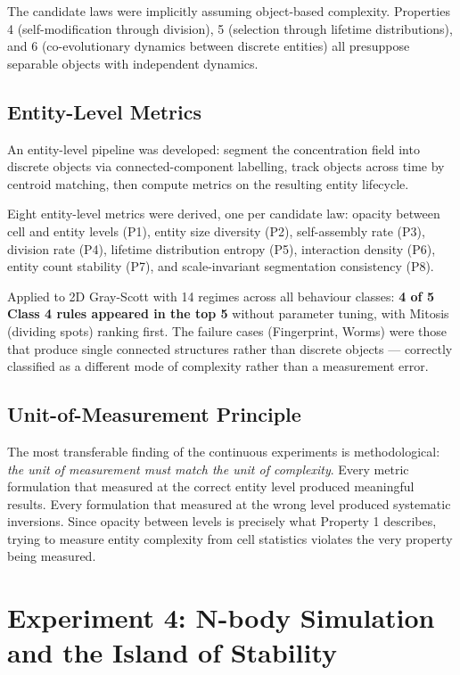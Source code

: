 \documentclass[12pt,a4paper]{article}
\begin{document}
The candidate laws were implicitly assuming object-based complexity.
Properties 4 (self-modification through division), 5 (selection through
lifetime distributions), and 6 (co-evolutionary dynamics between
discrete entities) all presuppose separable objects with independent
dynamics.

\subsection{Entity-Level Metrics}

An entity-level pipeline was developed: segment the concentration field
into discrete objects via connected-component labelling, track objects
across time by centroid matching, then compute metrics on the resulting
entity lifecycle.

Eight entity-level metrics were derived, one per candidate law:
opacity between cell and entity levels (P1), entity size diversity (P2),
self-assembly rate (P3), division rate (P4), lifetime distribution
entropy (P5), interaction density (P6), entity count stability (P7),
and scale-invariant segmentation consistency (P8).

Applied to 2D Gray-Scott with 14 regimes across all behaviour classes:
\textbf{4 of 5 Class 4 rules appeared in the top 5} without parameter
tuning, with Mitosis (dividing spots) ranking first.
The failure cases (Fingerprint, Worms) were those that produce single
connected structures rather than discrete objects — correctly classified
as a different mode of complexity rather than a measurement error.

\subsection{Unit-of-Measurement Principle}

The most transferable finding of the continuous experiments is
methodological: \emph{the unit of measurement must match the unit of
complexity}.
Every metric formulation that measured at the correct entity level
produced meaningful results.
Every formulation that measured at the wrong level produced systematic
inversions.
Since opacity between levels is precisely what Property 1 describes,
trying to measure entity complexity from cell statistics violates the
very property being measured.

\section{Experiment 4: N-body Simulation and the Island of Stability}
\end{document}
